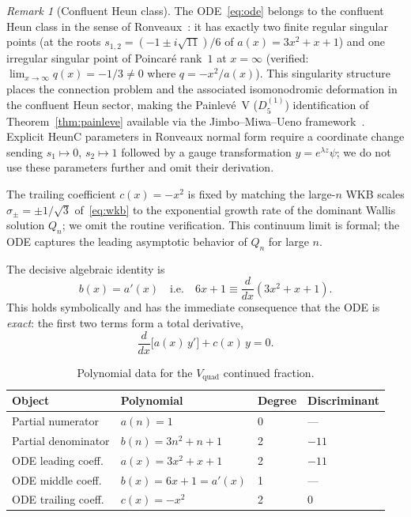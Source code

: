 \documentclass[11pt,a4paper]{article}
\theoremstyle{definition}
\theoremstyle{remark}
\newtheorem{remark}[theorem]{Remark}
\newcommand{\Vq}{V_{\mathrm{quad}}}
\begin{document}
\begin{remark}[Confluent Heun class]\label{rem:heunc}
The ODE~\eqref{eq:ode} belongs to the confluent Heun class in the
sense of Ronveaux~\cite{ronveaux1995}: it has exactly two finite
regular singular points (at the roots $s_{1,2}=(-1\pm i\sqrt{11})/6$
of $a(x)=3x^2+x+1$) and one irregular singular point of Poincar\'e
rank~$1$ at $x=\infty$ (verified: $\lim_{x\to\infty}q(x)=-1/3\ne 0$
where $q=-x^2/a(x)$). This singularity structure places the
connection problem and the associated isomonodromic deformation
in the confluent Heun sector, making the Painlev\'e~V ($D_5^{(1)}$)
identification of Theorem~\ref{thm:painleve} available via the
Jimbo--Miwa--Ueno framework~\cite{jimbo1981}. Explicit HeunC
parameters in Ronveaux normal form require a coordinate change
sending $s_1\mapsto 0$, $s_2\mapsto 1$ followed by a gauge
transformation $y=e^{\lambda z}\psi$; we do not use these
parameters further and omit their derivation.
\end{remark}

The trailing coefficient $c(x)=-x^2$ is fixed by
matching the large-$n$ WKB scales
$\sigma_\pm = \pm 1/\sqrt{3}$ of~\eqref{eq:wkb}
to the exponential growth rate of the dominant Wallis
solution $Q_n$; we omit the routine verification.
This continuum limit is formal; the ODE captures the
leading asymptotic behavior of $Q_n$ for large $n$.

The decisive algebraic identity is
\begin{equation}\label{eq:exact-identity}
  b(x) = a'(x)
  \quad\text{i.e.}\quad
  6x+1 \equiv \frac{d}{dx}(3x^2+x+1).
\end{equation}
This holds symbolically and has the immediate
consequence that the ODE is \emph{exact}: the
first two terms form a total derivative,
\begin{equation}\label{eq:exact-ode}
  \frac{d}{dx}\bigl[a(x)\,y'\bigr]
  + c(x)\,y = 0.
\end{equation}

\begin{table}[ht]
\centering
\caption{Polynomial data for the
$\Vq$ continued fraction.}
\label{tab:poly}
\small
\begin{tabular}{@{}llll@{}}
\toprule
Object & Polynomial & Degree & Discriminant \\
\midrule
Partial numerator & $a(n) = 1$ & 0 & --- \\
Partial denominator & $b(n) = 3n^2+n+1$ & 2 & $-11$ \\
ODE leading coeff.\ & $a(x) = 3x^2+x+1$ & 2 & $-11$ \\
ODE middle coeff.\ & $b(x) = 6x+1 = a'(x)$ & 1 & --- \\
ODE trailing coeff.\ & $c(x) = -x^2$ & 2 & $0$ \\
\bottomrule
\end{tabular}
\end{table}
\end{document}
